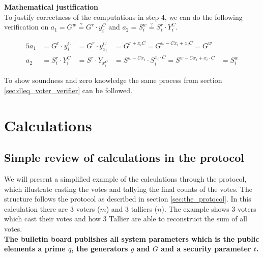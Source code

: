  \noindent
\textbf{Mathematical justification}\\
To justify correctness of the computations in step 4, we can do the following verification on \begin{math}a_1=G^w \stackrel{?}{=} G^r \cdot y_i^C\end{math} and \begin{math}a_2=S_i^w \stackrel{?}{=} S_i^r \cdot Y_i^C\end{math}.


\begin{alignat*}{5}
a_1 &=G^r \cdot y_i^C &=G^r \cdot y_{x_i}^C &=G^{r+x_iC} =G^{w-Cx_i+x_iC} =G^w\\
a_2 &= S_i^r \cdot Y_i^C &=S^r \cdot Y_{x_i^C} &=S^{w-Cx_i} \cdot S_i^{x_i \cdot C} =S^{w-Cx_i+x_i \cdot C}&=S_i^w
\end{alignat*}



\noindent
To show soundness and zero knowledge the same process from section \ref{sec:dleq_voter_verifier} can be followed.


\chapter{Calculations}
\section{Simple review of calculations in the protocol}
\label{sec:simple_review_of_calculations_in_the_protocol}
We will present a simplified example of the calculations through the protocol, which illustrate casting the votes and tallying the final counts of the votes. The structure follows the protocol as described in section \ref{sec:the_protocol}. In this calculation there are $3$ voters ($m$) and $3$ talliers ($n$). The example shows  3 voters which cast their votes and how 3 Tallier are able to reconstruct the sum of all votes.\\

\noindent
\textbf{The bulletin board publishes all system parameters which is the public elements a prime $q$,  the generators $g$ and $G$ and a security parameter $t$.}


